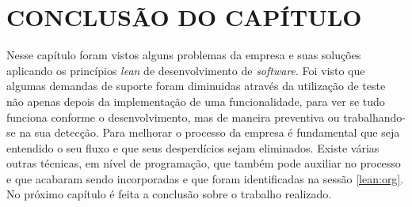 \section{CONCLUSÃO DO CAPÍTULO}

Nesse capítulo foram vistos alguns problemas da empresa e suas soluções aplicando os princípios \textit{lean} de desenvolvimento de \textit{software}. Foi visto que algumas demandas de suporte foram diminuidas através da utilização de teste não apenas depois da implementação de uma funcionalidade, para ver se tudo funciona conforme o desenvolvimento, mas de maneira preventiva ou trabalhando-se na sua detecção. Para melhorar o processo da empresa é fundamental que seja entendido o seu fluxo e que seus desperdícios sejam eliminados. Existe várias outras técnicas, em nível de programação, que também pode auxiliar no processo e que acabaram sendo incorporadas e que foram identificadas na sessão \ref{lean:org}. No próximo capítulo é feita a conclusão sobre o trabalho realizado.